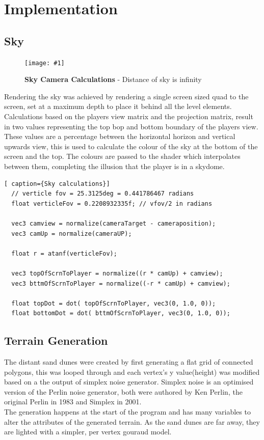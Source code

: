 \documentclass[conference]{acmsiggraph}
\newcommand{\figuremacroW}[4]{
	\begin{figure}[h] %
		\centering
		\texttt{[image: \#1]}
		\caption[#2]{\textbf{#2} - #3}
		\label{fig:#1}
	\end{figure}
}
\begin{document}
\section{Implementation}

\subsection{Sky}

\figuremacroW
{skydaigram}
{Sky Camera Calculations}
{Distance of sky is infinity}
{1.0}
Rendering the sky was achieved by rendering a single screen sized quad to the screen, set at a maximum depth to place it behind all the level elements. Calculations based on the players view matrix and the projection matrix, result in two values representing the top bop and bottom boundary of the players view. These values are a percentage between the horizontal horizon and vertical upwards view, this is used to calculate the colour of the sky at the bottom of the screen and the top. The colours are passed to the shader which interpolates between them, completing the illusion that the player is in a skydome.

\begin{lstlisting}[ caption={Sky calculations}]
  // verticle fov = 25.3125deg = 0.441786467 radians
  float verticleFov = 0.2208932335f; // vfov/2 in radians

  vec3 camview = normalize(cameraTarget - cameraposition);
  vec3 camUp = normalize(cameraUP);

  float r = atanf(verticleFov);

  vec3 topOfScrnToPlayer = normalize((r * camUp) + camview);
  vec3 bttmOfScrnToPlayer = normalize((-r * camUp) + camview);

  float topDot = dot( topOfScrnToPlayer, vec3(0, 1.0, 0));
  float bottomDot = dot( bttmOfScrnToPlayer, vec3(0, 1.0, 0));
\end{lstlisting}


\subsection{Terrain Generation}
The distant sand dunes were created by first generating a flat grid of connected polygons, this was looped through and each vertex's y value(height) was modified based on a the output of simplex noise generator. Simplex noise is an optimised version of the Perlin noise generator, both were authored by Ken Perlin, the original Perlin in 1983 and Simplex in 2001.\\
The generation happens at the start of the program and has many variables to alter the attributes of the generated terrain. As the sand dunes are far away, they are lighted with a simpler, per vertex gouraud model.
\end{document}
